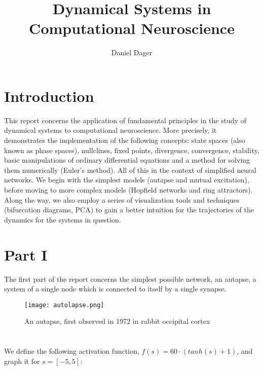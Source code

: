 \documentclass{article}
\makeatletter
\renewcommand{\maketitle}{
    {\raggedleft  %
    \vspace*{-10pt}  %
    {\large\@title \par}  %
    \vspace{5pt}  %
    {\normalsize\@author \par}
    \vspace{5pt}  %
    {\normalsize\@date \par}
    \vspace{20pt}}  %
}
\makeatother
\begin{document}
\title{Dynamical Systems in Computational Neuroscience}
\author{Daniel Dager}
\date{}
\maketitle

\pagestyle{empty} %
\thispagestyle{empty}

\renewcommand{\thesection}{1.\arabic{section}}

\section*{Introduction}
This report concerns the application of fundamental principles in the study of dynamical systems to computational neuroscience. More precisely, it demonstrates the implementation of the following concepts: state spaces (also known as phase spaces), nullclines, fixed points, divergence, convergence, stability, basic manipulations of ordinary differential equations and a method for solving them numerically (Euler's method). All of this in the context of simplified neural networks. We begin with the simplest models (autapse and mutual excitation), before moving to more complex models (Hopfield networks and ring attractors). Along the way, we also employ a series of visualization tools and techniques (bifurcation diagrams, PCA) to gain a better intuition for the trajectories of the dynamics for the systems in question.
\vspace{1em}



\section*{Part I}
The first part of the report concerns the simplest possible network, an autapse, a system of a single node which is connected to itself by a single synapse.

\begin{figure}[ht]
    \centering
    \texttt{[image: autolapse.png]}
    \caption{An autapse, first observed in 1972 in rabbit occipital cortex}
\end{figure}
\vspace{-1em}



\section{}
We define the following activation function, $f(s) = 60 \cdot (tanh(s) + 1)$, and graph it for $s = [-5, 5]$:
\end{document}
